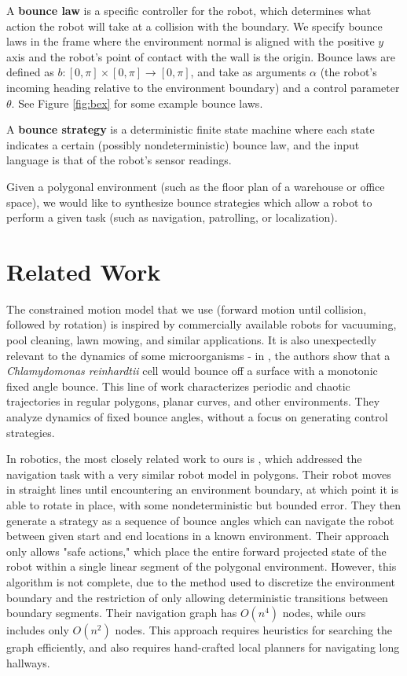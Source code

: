 \documentclass[]{styles/svproc}  %
\begin{document}
\begin{definition}
A \textbf{bounce law} is a specific controller for the robot, which determines
what action the robot will take at a collision with the boundary.
We specify 
bounce laws in the
frame where the environment normal is aligned with the positive $y$ axis and the
robot's point of contact with the wall is the origin.  
Bounce laws are defined as $b: [0,\pi] \times [0,\pi] \to [0,\pi]$, and take as
arguments $\alpha$ (the robot's incoming heading relative to the environment
boundary) and a control parameter $\theta$. See Figure \ref{fig:bex} for some
example bounce laws. 
\end{definition}

\begin{definition}
A \textbf{bounce strategy} is a deterministic finite state machine where each
state indicates a certain (possibly nondeterministic) bounce law, and the input language is that of the
robot's sensor readings.
\end{definition}

Given a polygonal environment (such as the floor plan of a warehouse or office
space), we would like to synthesize bounce strategies which allow a robot to
perform a given task (such as navigation, patrolling, or localization).

\section{Related Work}

The constrained motion model that we use (forward motion until collision,
followed by rotation) is inspired by commercially available robots
for vacuuming, pool cleaning, lawn mowing, and similar applications. It is also
unexpectedly relevant to the dynamics of some microorganisms - in \cite{microorganism2017}, the authors show that a
\textit{Chlamydomonas reinhardtii} cell would bounce off a surface with a
monotonic fixed angle bounce. This line of work characterizes periodic and
chaotic trajectories in regular polygons, planar curves, and other environments.
They analyze dynamics of fixed bounce angles, without a focus on generating control
strategies.

In robotics, the most closely related work to ours is \cite{LewOKa13}, which addressed 
the navigation task with a very similar robot
model in polygons. Their robot moves in straight lines until encountering an environment
boundary, at which point it is able to rotate in place, with some nondeterministic but
bounded error. They then generate a strategy as a sequence of bounce angles which can 
navigate the robot between given start and end locations in a known environment. Their approach only allows "safe actions," which place
the entire forward projected state of the robot within a single
linear segment of the polygonal environment. However, this algorithm is
not complete, due to the method used to discretize the environment boundary and
the restriction of only allowing deterministic transitions between boundary
segments. Their navigation graph has $O(n^4)$ nodes, while ours includes only $O(n^2)$
nodes. This approach requires heuristics for searching the graph efficiently,
and also requires hand-crafted local planners for navigating long hallways.
\end{document}
